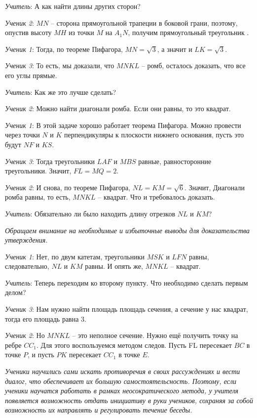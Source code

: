 \documentclass[a4paper,14pt,russian]{extreport}
\begin{document}
\textit{Учитель}: А как найти длины других сторон?

\textit{Ученик 2}: $MN$ – сторона прямоугольной трапеции в боковой грани, поэтому, опустив высоту $MH$ из точки $M$ на $A_1N$, получим прямоугольный треугольник $
$.

\textit{Ученик 1}: Тогда, по теореме Пифагора, $MN=\sqrt{3}$, а значит и $LK=\sqrt{3}$.

\textit{Ученик 3}: То есть, мы доказали, что $MNKL$ – ромб, осталось доказать, что все его углы прямые.

\textit{Учитель}: Как же это лучше сделать?

\textit{Ученик 2}: Можно найти диагонали ромба. Если они равны, то это квадрат.

\textit{Ученик 1}: В этой задаче хорошо работает теорема Пифагора. Можно провести через точки $N$ и $K$ перпендикуляры к плоскости нижнего основания, пусть это будут $NF$ и $KS$.

\textit{Ученик 3}: Тогда треугольники $LAF$ и $MBS$ равные, равносторонние треугольники. Значит, $FL=MQ=2$.

\textit{Ученик 2}: И снова, по теореме Пифагора, $NL=KM=\sqrt{6}$. Значит, Диагонали ромба равны, то есть, $MNKL$ – квадрат. Что и требовалось доказать.

\textit{Учитель}: Обязательно ли было находить длину отрезков $NL$ и $KM$?

\textit{Обращаем внимание на необходимые и избыточные выводы для доказательства утверждения.}

\textit{Ученик 1}: Нет, по двум катетам, треугольники $MSK$ и $LFN$ равны, следовательно, $NL$ и $KM$ равны. И опять же, $MNKL$ – квадрат.

\textit{Учитель}: Теперь переходим ко второму пункту. Что необходимо сделать первым делом?

\textit{Ученик 3}: Нам нужно найти площадь площадь сечения, а сечение у нас квадрат, тогда его площадь равна 3.

\textit{Ученик 2}: Но $MNKL$ – это неполное сечение. Нужно ещё получить точку на ребре $CC_1$. Для этого воспользуемся методом следов. Пусть FL пересекает $BC$ в точке $P$, и пусть $PK$ пересекает $CC_1$ в точке $E$. 

\textit{Ученики научились сами искать противоречия в своих рассуждениях и вести диалог, что обеспечивает их большую самостоятельсность. Поэтому, если ученики научатся работать в рамках неосократического метода, у учителя появляется возможность отдать инициативу в руки учеников, сохраняя за собой возможность их направлять и регулировать течение беседы.}
\end{document}

